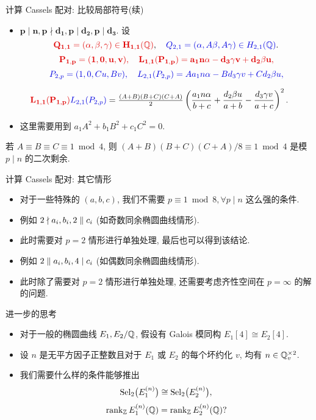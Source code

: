 \documentclass[aspectratio=169,handout]{ctexbeamer}
\begin{document}
\begin{frame}{计算 Cassels 配对: 比较局部符号(续)}
\begin{itemize}
\item $\bm{p\mid n,p\nmid d_1,p\mid d_2,p\mid d_3}$.
\onslide<+-> 
设
\[\alert{Q_{1,1}=(\alpha,\beta,\gamma)\in H_{1,1}(\BQ)},\quad
\emph{Q_{2,1}=(\alpha,A\beta,A\gamma)\in H_{2,1}(\BQ)}.\]
\[\alert{P_{1,p}=(1,0,u,v),\quad
L_{1,1}(P_{1,p})=a_1n\alpha-d_3\gamma v+d_2\beta u,}\]
\[\emph{P_{2,p}=(1,0,Cu,Bv),\quad
L_{2,1}(P_{2,p})=Aa_1n\alpha-Bd_3\gamma v+Cd_2\beta u,}\]
\end{itemize}
\onslide<+-> 
\[\alert{L_{1,1}(P_{1,p})}\emph{L_{2,1}(P_{2,p})}=\tfrac{(A+B)(B+C)(C+A)}2\left(\frac{a_1n\alpha}{b+c}+\frac{d_2\beta u}{a+b}-\frac{d_3\gamma v}{a+c}\right)^2.\]
\begin{itemize}
\item 这里需要用到 $a_1A^2+b_1B^2+c_1C^2=0$.
\end{itemize}
\begin{lemma}
若 $A\equiv B\equiv C\equiv 1\bmod 4$, 则 $(A+B)(B+C)(C+A)/8\equiv 1\bmod 4$ 是模 $p\mid n$ 的二次剩余.
\end{lemma}
\end{frame}


\begin{frame}{计算 Cassels 配对: 其它情形}
\begin{itemize}
\item 对于一些特殊的 $(a,b,c)$, 我们不需要 $p\equiv 1\bmod 8,\forall p\mid n$ 这么强的条件.
\item 例如 $2\nmid a_i,b_i,2\parallel c_i$ (如奇数同余椭圆曲线情形).
\item 此时需要对 $p=2$ 情形进行单独处理, 最后也可以得到该结论.
\item 例如 $2\parallel a_i,b_i, 4\mid c_i$ (如偶数同余椭圆曲线情形).
\item 此时除了需要对 $p=2$ 情形进行单独处理, 还需要考虑齐性空间在 $p=\infty$ 的解的问题.
\end{itemize}
\end{frame}

\begin{frame}{进一步的思考}
\begin{itemize}
\item 对于一般的椭圆曲线 $E_1,E_2/{\mathbb{Q}}$, 假设有 Galois 模同构 $E_1[4]\cong E_2[4]$.
\item 设 $n$ 是无平方因子正整数且对于 $E_1$ 或 $E_2$ 的每个坏约化 $v$, 均有 $n\in{\mathbb{Q}}_v^{\times2}$.
\item 我们需要什么样的条件能够推出
\[{\mathrm{Sel}}_2\bigl(E_1^{(n)}\bigr)\cong{\mathrm{Sel}}_2\bigl(E_2^{(n)}\bigr),\]
\[\operatorname{rank}_{\mathbb{Z}} E_1^{(n)}({\mathbb{Q}})=\operatorname{rank}_{\mathbb{Z}} E_2^{(n)}({\mathbb{Q}})?\]
\end{itemize}
\end{frame}
\end{document}
